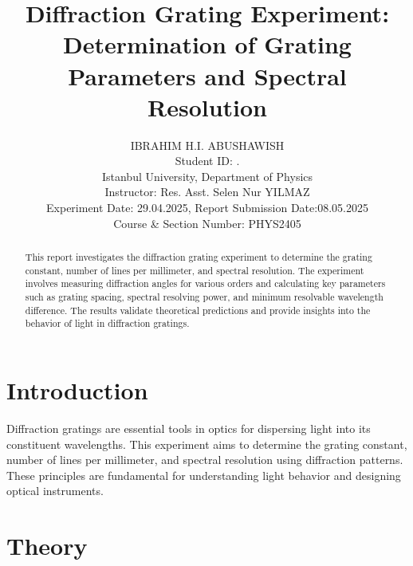 \documentclass[journal]{IEEEtran}
\begin{document}
\title{Diffraction Grating Experiment: Determination of Grating Parameters and Spectral Resolution}
\author{IBRAHIM H.I. ABUSHAWISH \\

{\small Student ID: \hspace{1.5cm}. \\ 
Istanbul University, Department of Physics \\
Instructor: Res. Asst. Selen Nur YILMAZ\\
Experiment Date: 29.04.2025, Report Submission Date:08.05.2025 \\
Course \& Section Number: PHYS2405}}


\maketitle

\begin{abstract}
    This report investigates the diffraction grating experiment to determine the grating constant, number of lines per millimeter, and spectral resolution. The experiment involves measuring diffraction angles for various orders and calculating key parameters such as grating spacing, spectral resolving power, and minimum resolvable wavelength difference. The results validate theoretical predictions and provide insights into the behavior of light in diffraction gratings.
\end{abstract}

\section{Introduction}
Diffraction gratings are essential tools in optics for dispersing light into its constituent wavelengths. This experiment aims to determine the grating constant, number of lines per millimeter, and spectral resolution using diffraction patterns. These principles are fundamental for understanding light behavior and designing optical instruments.

\section{Theory}
\end{document}
